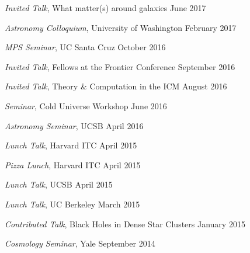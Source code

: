 \begin{talkenum}

\item \textit{Invited Talk}, What matter(s) around galaxies \hspace*{\fill} June 2017

\item \textit{Astronomy Colloquium}, University of Washington \hspace*{\fill} February 2017

\item \textit{MPS Seminar}, UC Santa Cruz \hspace*{\fill} October 2016

\item \textit{Invited Talk}, Fellows at the Frontier Conference \hspace*{\fill} September 2016

\item \textit{Invited Talk}, Theory \& Computation in the ICM \hspace*{\fill} August 2016

\item \textit{Seminar}, Cold Universe Workshop \hspace*{\fill} June 2016

\item \textit{Astronomy Seminar}, UCSB \hspace*{\fill} April 2016

\item \textit{Lunch Talk}, Harvard ITC \hspace*{\fill} April 2015

\item \textit{Pizza Lunch}, Harvard ITC \hspace*{\fill} April 2015

\item \textit{Lunch Talk}, UCSB \hspace*{\fill} April 2015

\item \textit{Lunch Talk}, UC Berkeley \hspace*{\fill} March 2015

\item \textit{Contributed Talk}, Black Holes in Dense Star Clusters \hspace*{\fill} January 2015

\item \textit{Cosmology Seminar}, Yale \hspace*{\fill} September 2014


\end{talkenum}
